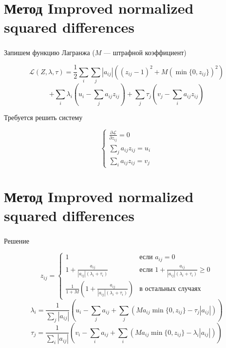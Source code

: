 \documentclass{beamer}
\begin{document}
\section{Метод Improved normalized squared differences}
\begin{frame}
	\frametitle{\insertsection}
	
	Запишем функцию Лагранжа ($M$ — штрафной коэффициент)
	
	$$\mathcal{L}(Z, \lambda, \tau) = \frac{1}{2} \sum_i \sum_j |a_{ij}|\left((z_{ij}-1)^2 + M(\min\{0, z_{ij}\})^2\right)$$
	$$+ \sum_i \lambda_i\left(u_i - \sum_j a_{ij}z_{ij}\right) + \sum_j \tau_j \left(v_j - \sum_i a_{ij}z_{ij} \right)$$
	
	Требуется решить систему
	
	$$\begin{cases}
	\frac{\partial \mathcal L}{\partial z_{ij}} = 0 \\
	\sum_j a_{ij}z_{ij} = u_{i} \\
	\sum_i a_{ij}z_{ij} = v_{j}
	\end{cases}$$
	
\end{frame}

\section{Метод Improved normalized squared differences}
\begin{frame}
	\frametitle{\insertsection}
	
	Решение
	
	$$z_{ij} = 
	\begin{cases}
	1 & \text{если } a_{ij} = 0\\
	1 + \frac{a_{ij}}{|a_{ij}|(\lambda_i + \tau_i)} & \text{если } 1 + \frac{a_{ij}}{|a_{ij}|(\lambda_i + \tau_i)} \geq 0 \\
	\frac{1}{1+M}(1 + \frac{a_{ij}}{|a_{ij}|(\lambda_i + \tau_i)}) & \text{в остальных случаях}
	\end{cases}$$
	$$\lambda_i = \frac{1}{\sum_j|a_{ij}|}\left(u_i-\sum_ja_{ij} +\sum_j(M a_{ij} \min \{0, z_{ij}\} - \tau_j|a_{ij}|) \right)$$
	$$\tau_j = \frac{1}{\sum_i |a_{ij}| }\left(v_i-\sum_i a_{ij} +\sum_i(M a_{ij} \min \{0, z_{ij}\} - \lambda_i|a_{ij}|) \right)$$
	
\end{frame}
\end{document}
